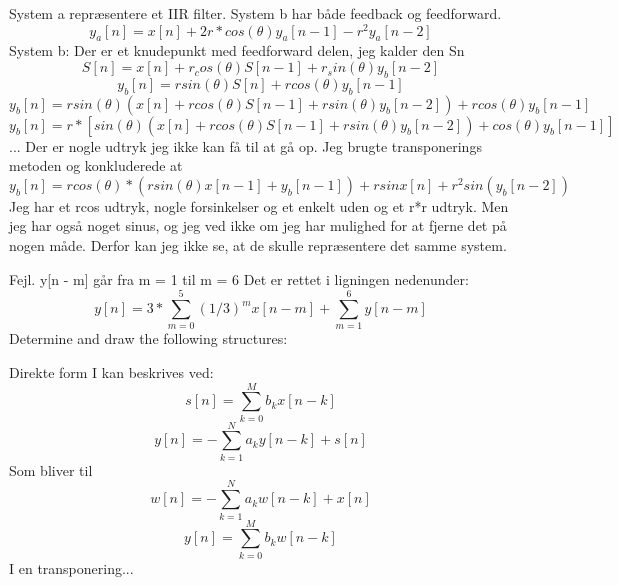 \begin{Opgaver}
\begin{kapitel}
\begin{Opgave}[Opgave 9.1]
\begin{UnderOpgave}
            \end{UnderOpgave}
        \end{Opgave}
        \begin{Opgave}
            \begin{UnderOpgave}
                System a repræsentere et IIR filter. 
                System b har både feedback og feedforward. 
                \[y_a[n] = x[n] + 2r*cos(\theta)y_a[n - 1] - r^2y_a[n - 2]\]
                System b: Der er et knudepunkt med feedforward delen, jeg kalder den Sn 
                \[S[n] = x[n] + r_cos(\theta)S[n - 1] + r_sin(\theta)y_b[n - 2]\]
                \[y_b[n] = rsin(\theta)S[n] + rcos(\theta)y_b[n - 1]\]
                \[y_b[n] = rsin(\theta)(x[n] + rcos(\theta)S[n - 1] + rsin(\theta)y_b[n - 2]) + rcos(\theta)y_b[n - 1]\]
                \[y_b[n] = r*[sin(\theta)(x[n] + rcos(\theta)S[n - 1] + rsin(\theta)y_b[n - 2]) + cos(\theta)y_b[n - 1]]\]
                ... 
                Der er nogle udtryk jeg ikke kan få til at gå op. Jeg brugte transponerings metoden og konkluderede at
                \[y_b[n] = rcos(\theta) * (rsin(\theta)x[n - 1] + y_b[n - 1]) + rsinx[n] + r^2sin(y_b[n - 2])\]
                Jeg har et rcos udtryk, nogle forsinkelser og et enkelt uden og et r*r udtryk. Men jeg har også noget sinus, og jeg ved ikke om jeg har mulighed for at fjerne det på nogen måde. 
                Derfor kan jeg ikke se, at de skulle repræsentere det samme system. 

            \end{UnderOpgave}
        \end{Opgave}
        \begin{Opgave}[Opgave 9.3]  
            Fejl. y[n - m] går fra m = 1 til m = 6
            Det er rettet i ligningen nedenunder: 
            \[y[n] = 3 * \sum_{m = 0}^{5}{(1/3)^m x[n - m]} + \sum_{m = 1}^{6}{y[n - m]}\]
            Determine and draw the following structures: 
            \begin{UnderOpgave}
                Direkte form I kan beskrives ved: 
                \[s[n] = \sum_{k = 0}^{M}{b_k x[n - k]}\]
                \[y[n] = -\sum_{k=1}^{N}a_{k}y[n-k]+s[n]\]
                Som bliver til 
                \[w[n]=-\sum_{k=1}^{N}a_{k}w[n-k]+x[n]\]
                \[y[n]=\sum_{k=0}^{M}b_{k}w[n-k]\]
                I en transponering...


\end{UnderOpgave}
\end{Opgave}
\end{kapitel}
\end{Opgaver}
